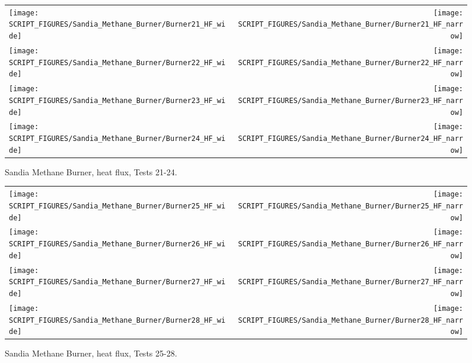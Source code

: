\begin{figure}[p]
\begin{tabular*}{\textwidth}{l@{\extracolsep{\fill}}r}
\texttt{[image: SCRIPT\_FIGURES/Sandia\_Methane\_Burner/Burner21\_HF\_wide]} &
\texttt{[image: SCRIPT\_FIGURES/Sandia\_Methane\_Burner/Burner21\_HF\_narrow]} \\
\texttt{[image: SCRIPT\_FIGURES/Sandia\_Methane\_Burner/Burner22\_HF\_wide]} &
\texttt{[image: SCRIPT\_FIGURES/Sandia\_Methane\_Burner/Burner22\_HF\_narrow]} \\
\texttt{[image: SCRIPT\_FIGURES/Sandia\_Methane\_Burner/Burner23\_HF\_wide]} &
\texttt{[image: SCRIPT\_FIGURES/Sandia\_Methane\_Burner/Burner23\_HF\_narrow]} \\
\texttt{[image: SCRIPT\_FIGURES/Sandia\_Methane\_Burner/Burner24\_HF\_wide]} &
\texttt{[image: SCRIPT\_FIGURES/Sandia\_Methane\_Burner/Burner24\_HF\_narrow]}
\end{tabular*}
\caption[Sandia Methane Burner, heat flux, Tests 21-24] {Sandia Methane Burner, heat flux, Tests 21-24.}
\label{Sandia_Methane_Burner_HF_6}
\end{figure}

\begin{figure}[p]
\begin{tabular*}{\textwidth}{l@{\extracolsep{\fill}}r}
\texttt{[image: SCRIPT\_FIGURES/Sandia\_Methane\_Burner/Burner25\_HF\_wide]} &
\texttt{[image: SCRIPT\_FIGURES/Sandia\_Methane\_Burner/Burner25\_HF\_narrow]} \\
\texttt{[image: SCRIPT\_FIGURES/Sandia\_Methane\_Burner/Burner26\_HF\_wide]} &
\texttt{[image: SCRIPT\_FIGURES/Sandia\_Methane\_Burner/Burner26\_HF\_narrow]} \\
\texttt{[image: SCRIPT\_FIGURES/Sandia\_Methane\_Burner/Burner27\_HF\_wide]} &
\texttt{[image: SCRIPT\_FIGURES/Sandia\_Methane\_Burner/Burner27\_HF\_narrow]} \\
\texttt{[image: SCRIPT\_FIGURES/Sandia\_Methane\_Burner/Burner28\_HF\_wide]} &
\texttt{[image: SCRIPT\_FIGURES/Sandia\_Methane\_Burner/Burner28\_HF\_narrow]}
\end{tabular*}
\caption[Sandia Methane Burner, heat flux, Tests 25-28] {Sandia Methane Burner, heat flux, Tests 25-28.}
\label{Sandia_Methane_Burner_HF_7}
\end{figure}

\clearpage

